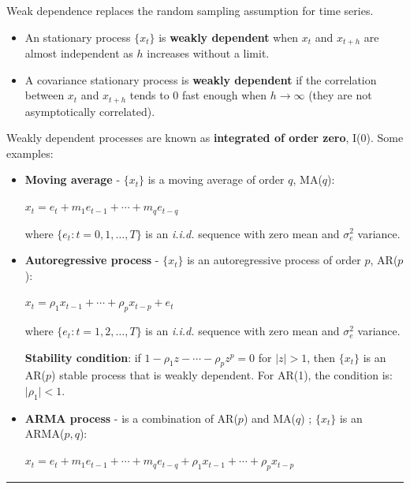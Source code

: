   \begin{f}

Weak dependence replaces the random sampling assumption for time series.

\begin{itemize}[leftmargin=*]
	\item An stationary process \(\lbrace x_{t} \rbrace\) is \textbf{weakly dependent} when \(x_{t}\) and \(x_{t + h}\) are almost independent as \(h\) increases without a limit.
	\item A covariance stationary process is \textbf{weakly dependent} if the correlation between \(x_{t}\) and \(x_{t + h}\) tends to \(0\) fast enough when \(h \rightarrow \infty\) (they are not asymptotically correlated).
\end{itemize}

Weakly dependent processes are known as \textbf{integrated of order zero}, I(0). Some examples:

\begin{itemize}[leftmargin=*]
\item \textbf{Moving average} - \(\lbrace x_{t} \rbrace\) is a moving average of order \(q\), MA(\(q\)):

\begin{center}
	\(x_{t} = e_{t} + m_{1} e_{t - 1} + \cdots + m_{q} e_{t - q}\)
\end{center}

where \(\lbrace e_{t}: t = 0, 1, \ldots, T \rbrace\) is an \textsl{i.i.d.} sequence with zero mean and \(\sigma^{2}_{e}\) variance.

\item \textbf{Autoregressive process} - \(\lbrace x_{t} \rbrace\) is an autoregressive process of order \(p\), AR(\(p\)):

\begin{center}
	\(x_{t} = \rho_{1} x_{t - 1} + \cdots + \rho_{p} x_{t - p} + e_{t}\)
\end{center}

where \(\lbrace e_{t}: t = 1, 2, \ldots, T \rbrace\) is an \textsl{i.i.d.} sequence with zero mean and \(\sigma^{2}_{e}\) variance.

\textbf{Stability condition}: if \(1 - \rho_{1} z - \cdots - \rho_{p} z^{p} = 0\) for \(\lvert z \rvert > 1\), then \(\lbrace x_{t} \rbrace\) is an AR(\(p\)) stable process that is weakly dependent. For AR(1), the condition is: \(\lvert \rho_{1} \rvert < 1\).

\item \textbf{ARMA process} - is a combination of AR(\(p\)) and MA(\(q\)) ; \(\lbrace x_{t} \rbrace\) is an ARMA(\(p, q\)):

\begin{center}
	\(x_{t} = e_{t} + m_{1} e_{t - 1} + \cdots + m_{q} e_{t - q} + \rho_{1} x_{t - 1} + \cdots + \rho_{p} x_{t - p}\)
\end{center}
\end{itemize}


		\end{f}  \hrule

